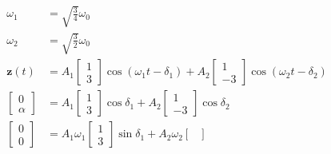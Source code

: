 \documentclass{article}
\renewcommand{\vec}[1]{\boldsymbol{\mathbf{#1}}}
\begin{document}
\begin{enumerate}
        \begin{align*}
          \omega_1        & = \sqrt{\frac{3}{4}} \omega_0                                                                     \\
          \omega_2        & = \sqrt{\frac{3}{2}} \omega_0                                                                     \\
          \vec{z}(t)      & = A_1 \begin{bmatrix}
                                    1 \\
                                    3
                                  \end{bmatrix} \cos (\omega_1 t - \delta_1) + A_2 \begin{bmatrix}
                                                                                     1 \\
                                                                                     -3
                                                                                   \end{bmatrix} \cos (\omega_2 t - \delta_2) \\
          \begin{bmatrix}
            0 \\
            \alpha
          \end{bmatrix} & = A_1 \begin{bmatrix}
                                  1 \\
                                  3
                                \end{bmatrix} \cos \delta_1 + A_2 \begin{bmatrix}
                                                                    1 \\
                                                                    -3
                                                                  \end{bmatrix} \cos \delta_2                                 \\
          \begin{bmatrix}
            0 \\
            0
          \end{bmatrix} & = A_1 \omega_1 \begin{bmatrix}
                                           1 \\
                                           3
                                         \end{bmatrix} \sin \delta_1 + A_2 \omega_2 \begin{bmatrix}

\end{bmatrix}
\end{align*}
\end{enumerate}
\end{document}

